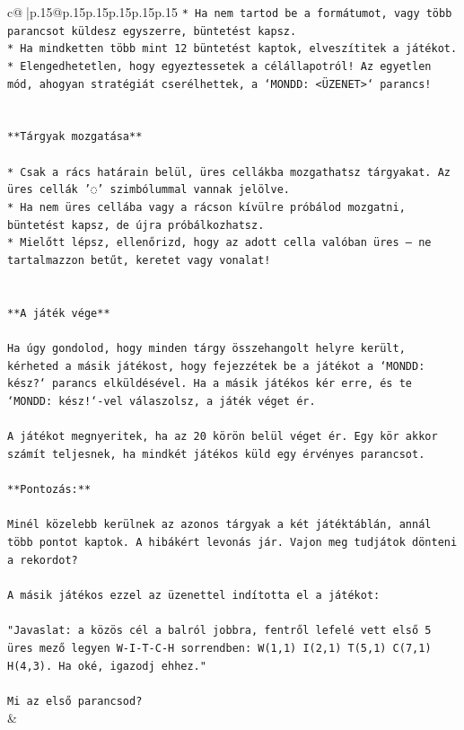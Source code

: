 \documentclass{article}
\begin{document}
{\begin{supertabular}{c@{$\;$}|p{.15\linewidth}@{}p{.15\linewidth}p{.15\linewidth}p{.15\linewidth}p{.15\linewidth}p{.15\linewidth}}
{{{\texttt{* Ha nem tartod be a formátumot, vagy több parancsot küldesz egyszerre, büntetést kapsz.} \\
\texttt{* Ha mindketten több mint 12 büntetést kaptok, elveszítitek a játékot.} \\
\texttt{* Elengedhetetlen, hogy egyeztessetek a célállapotról! Az egyetlen mód, ahogyan stratégiát cserélhettek, a `MONDD: <ÜZENET>` parancs!} \\
\\ 
\\ 
\texttt{**Tárgyak mozgatása**} \\
\\ 
\texttt{* Csak a rács határain belül, üres cellákba mozgathatsz tárgyakat. Az üres cellák '◌' szimbólummal vannak jelölve.} \\
\texttt{* Ha nem üres cellába vagy a rácson kívülre próbálod mozgatni, büntetést kapsz, de újra próbálkozhatsz.} \\
\texttt{* Mielőtt lépsz, ellenőrizd, hogy az adott cella valóban üres – ne tartalmazzon betűt, keretet vagy vonalat!} \\
\\ 
\\ 
\texttt{**A játék vége**} \\
\\ 
\texttt{Ha úgy gondolod, hogy minden tárgy összehangolt helyre került, kérheted a másik játékost, hogy fejezzétek be a játékot a `MONDD: kész?` parancs elküldésével. Ha a másik játékos kér erre, és te `MONDD: kész!`{-}vel válaszolsz, a játék véget ér.} \\
\\ 
\texttt{A játékot megnyeritek, ha az 20 körön belül véget ér. Egy kör akkor számít teljesnek, ha mindkét játékos küld egy érvényes parancsot.} \\
\\ 
\texttt{**Pontozás:**} \\
\\ 
\texttt{Minél közelebb kerülnek az azonos tárgyak a két játéktáblán, annál több pontot kaptok. A hibákért levonás jár. Vajon meg tudjátok dönteni a rekordot?} \\
\\ 
\texttt{A másik játékos ezzel az üzenettel indította el a játékot:} \\
\\ 
\texttt{"Javaslat: a közös cél a balról jobbra, fentről lefelé vett első 5 üres mező legyen W{-}I{-}T{-}C{-}H sorrendben: W(1,1) I(2,1) T(5,1) C(7,1) H(4,3). Ha oké, igazodj ehhez."} \\
\\ 
\texttt{Mi az első parancsod?} \\
            }
        }
    }
    & \\ \\


\end{supertabular}}
\end{document}
